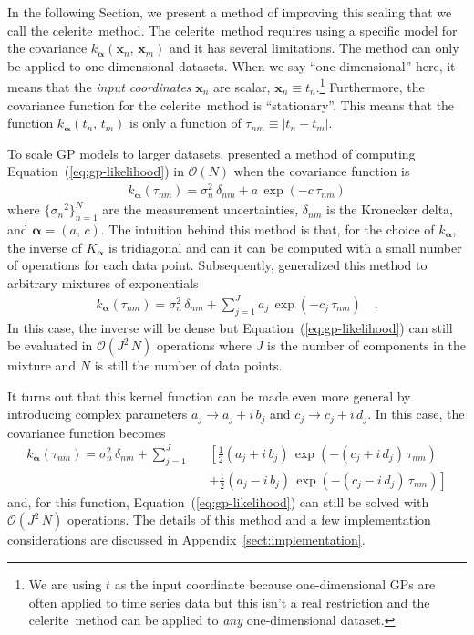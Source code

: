 \documentclass[manuscript, letterpaper]{aastex6}
\makeatletter
\let\origsection\section
\renewcommand\section{\@ifstar{\starsection}{\nostarsection}}
\newcommand\nostarsection[1]{\sectionprelude\origsection{#1}}
\newcommand\starsection[1]{\sectionprelude\origsection*{#1}}
\newcommand\sectionprelude{\vspace{1em}}
\newcommand{\project}[1]{\textsf{#1}}
\newcommand{\celerite}{\project{celerite}}
\renewcommand{\eqref}[1]{\ref{eq:#1}}
\newcommand{\Eq}[1]{Equation~(\eqref{#1})}
\newcommand{\eq}[1]{\Eq{#1}}
\newcommand{\eqlabel}[1]{\label{eq:#1}}
\newcommand{\sectref}[1]{\ref{sect:#1}}
\newcommand{\App}[1]{Appendix~\sectref{#1}}
\newcommand{\app}[1]{\App{#1}}
\newcommand{\bvec}[1]{{\ensuremath{\boldsymbol{#1}}}}
\makeatother
\begin{document}
In the following Section, we present a method of improving this scaling that
we call the \celerite\ method.
The \celerite\ method requires using a specific model for the covariance
$k_\bvec{\alpha}(\bvec{x}_n,\,\bvec{x}_m)$ and it has several limitations.
The method can only be applied to one-dimensional datasets.
When we say ``one-dimensional'' here, it means that the \emph{input
coordinates} $\bvec{x}_n$ are scalar, $\bvec{x}_n \equiv t_n$.\footnote{We are
using $t$ as the input coordinate because one-dimensional GPs are often
applied to time series data but this isn't a real restriction and the \celerite\
method can be applied to \emph{any} one-dimensional dataset.}
Furthermore, the covariance function for the \celerite\ method is ``stationary''.
This means that the function $k_\bvec{\alpha}(t_n,\,t_m)$ is only a function
of $\tau_{nm} \equiv |t_n - t_m|$.


\section{The celerite model}

To scale GP models to larger datasets, \citet{Rybicki:1995} presented a method
of computing \eq{gp-likelihood} in $\mathcal{O}(N)$ when the covariance
function is
\begin{eqnarray}\eqlabel{kernel-simple}
k_\bvec{\alpha}(\tau_{nm}) = \sigma_n^2\,\delta_{nm} + a\,\exp(-c\,\tau_{nm})
\end{eqnarray}
where $\{{\sigma_n}^2\}_{n=1}^N$ are the measurement uncertainties,
$\delta_{nm}$ is the Kronecker delta, and $\bvec{\alpha} = (a,\,c)$.
The intuition behind this method is that, for the choice of $k_\bvec{\alpha}$,
the inverse of $K_\bvec{\alpha}$ is tridiagonal and can it can be computed
with a small number of operations for each data point.
Subsequently, \citet{Ambikasaran:2015} generalized this method to arbitrary
mixtures of exponentials
\begin{eqnarray}
k_\bvec{\alpha}(\tau_{nm}) = \sigma_n^2\,\delta_{nm} +
    \sum_{j=1}^J a_j\,\exp(-c_j\,\tau_{nm})\quad.
\end{eqnarray}
In this case, the inverse will be dense but \eq{gp-likelihood} can still be
evaluated in $\mathcal{O}(J^2\,N)$ operations where $J$ is the number of
components in the mixture and $N$ is still the number of data points.

It turns out that this kernel function can be made even more general by
introducing complex parameters $a_j \to a_j+i\,b_j$ and $c_j \to c_j+i\,d_j$.
In this case, the covariance function becomes
\begin{eqnarray}\eqlabel{celerite-kernel-complex}
k_\bvec{\alpha}(\tau_{nm}) = \sigma_n^2\,\delta_{nm} +
    \sum_{j=1}^J &&\left[
    \frac{1}{2}(a_j + i\,b_j)\,\exp\left(-(c_j+i\,d_j)\,\tau_{nm}\right)
        \right. \nonumber\\
    &&+\left.
    \frac{1}{2}(a_j - i\,b_j)\,\exp\left(-(c_j-i\,d_j)\,\tau_{nm}\right)
\right]
\end{eqnarray}
and, for this function, \eq{gp-likelihood} can still be solved with
$\mathcal{O}(J^2\,N)$ operations.
The details of this method and a few implementation considerations are
discussed in \app{implementation}.
\end{document}
